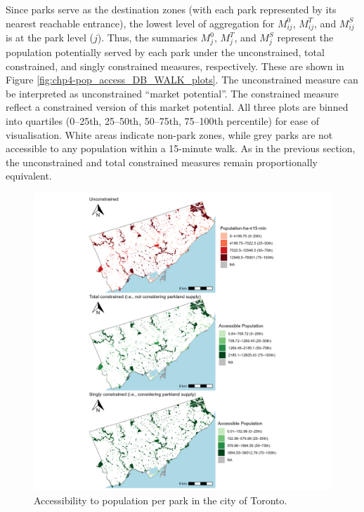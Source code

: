 \documentclass[
11pt, %
oneside, %
english, %
singlespacing, %
]{macthesis} %
\begin{document}
Since parks serve as the destination zones (with each park represented by its nearest reachable entrance), the lowest level of aggregation for \(M^0_{ij}\), \(M^T_{ij}\), and \(M^S_{ij}\) is at the park level (\(j\)). Thus, the summaries \(M^0_j\), \(M^T_j\), and \(M^S_j\) represent the population potentially served by each park under the unconstrained, total constrained, and singly constrained measures, respectively. These are shown in Figure \ref{fig:chp4-pop_access_DB_WALK_plots}. The unconstrained measure can be interpreted as unconstrained ``market potential''. The constrained measure reflect a constrained version of this market potential. All three plots are binned into quartiles (0--25th, 25--50th, 50--75th, 75--100th percentile) for ease of visualisation. White areas indicate non-park zones, while grey parks are not accessible to any population within a 15-minute walk. As in the previous section, the unconstrained and total constrained measures remain proportionally equivalent.

\begin{figure}

{\centering \includegraphics[width=6in]{./data/figures/chp4-pop_access_DB_WALK_plots} 

}

\caption{\label{fig:chp4-pop_access_DB_WALK_plots}Accessibility to population per park in the city of Toronto.}\label{fig:unnamed-chunk-66}
\end{figure}
\end{document}
